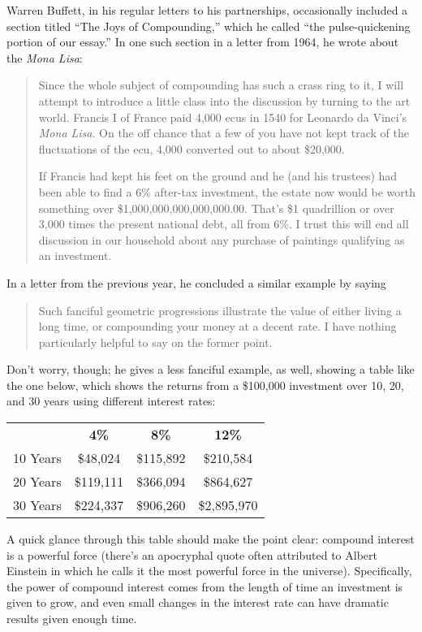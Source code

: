 \setcounter{ExampleCounter}{1}
Warren Buffett, in his regular letters to his partnerships, occasionally included a section titled ``The Joys of Compounding,'' which he called ``the pulse-quickening portion of our essay.''  In one such section in a letter from 1964, he wrote about the \emph{Mona Lisa}:
\begin{quote}
Since the whole subject of compounding has such a crass ring to it, I will attempt to introduce a little class into the discussion by turning to the art world.  Francis I of France paid 4,000 ecus in 1540 for Leonardo da Vinci's \emph{Mona Lisa}.  On the off chance that a few of you have not kept track of the fluctuations of the ecu, 4,000 converted out to about \$20,000.

If Francis had kept his feet on the ground and he (and his trustees) had been able to find a 6\% after-tax investment, the estate now would be worth something over \$1,000,000,000,000,000.00.  That's \$1 quadrillion or over 3,000 times the present national debt, all from 6\%.  I trust this will end all discussion in our household about any purchase of paintings qualifying as an investment.
\end{quote}

In a letter from the previous year, he concluded a similar example by saying
\begin{quote}
Such fanciful geometric progressions illustrate the value of either living a long time, or compounding your money at a decent rate.  I have nothing particularly helpful to say on the former point.
\end{quote}

Don't worry, though; he gives a less fanciful example, as well, showing a table like the one below, which shows the returns from a \$100,000 investment over 10, 20, and 30 years using different interest rates:
\begin{center}
\begin{tabular}{l c c c}
 & \textbf{4\%} & \textbf{8\%} & \textbf{12\%}\\
10 Years & \$48,024 & \$115,892 & \$210,584\\
20 Years & \$119,111 & \$366,094 & \$864,627\\
30 Years & \$224,337 & \$906,260 & \$2,895,970
\end{tabular}
\end{center}

A quick glance through this table should make the point clear: compound interest is a powerful force (there's an apocryphal quote often attributed to Albert Einstein in which he calls it the most powerful force in the universe).  Specifically, the power of compound interest comes from the length of time an investment is given to grow, and even small changes in the interest rate can have dramatic results given enough time.


